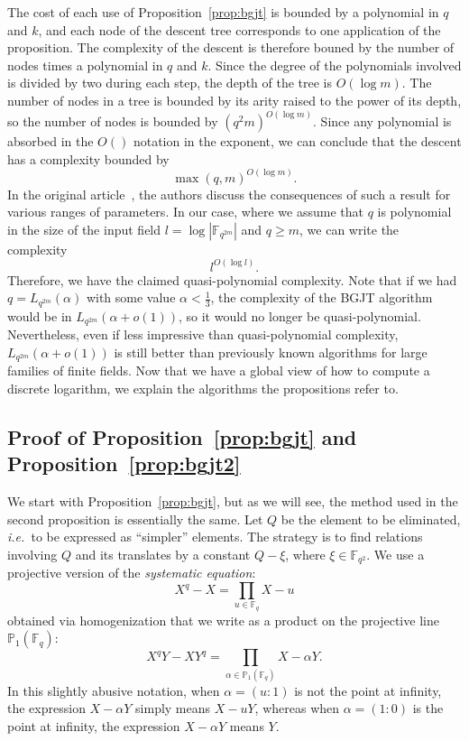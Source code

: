 \documentclass[a4paper,11pt]{article}
\theoremstyle{break}
\theoremstyle{sc}
\theoremstyle{definition}
\theoremstyle{remark}
\newcommand{\ie}{\emph{i.e.\ }}
\begin{document}
The cost of each use of Proposition~\ref{prop:bgjt} is bounded by a polynomial in $q$ and
$k$, and each node of the descent tree corresponds to one application of the
proposition. The complexity of the descent is therefore bouned by the number of
nodes times a polynomial in $q$ and $k$. Since the degree of the polynomials
involved is divided by two during each step, the depth of the tree is
$O(\log m)$. The number of nodes in a tree is bounded by its arity raised to the power
of its depth, so the number of nodes is bounded by $(q^2m)^{O(\log m)}$. Since
any polynomial is absorbed in the $O()$ notation in the exponent, we can
conclude that the descent has a complexity bounded by
\[
  \max(q, m)^{O(\log m)}.
\]
In the original article~\cite{BGJT13}, the authors discuss the consequences of
such a result for various ranges of parameters. In our case, where we assume
that $q$ is polynomial in the size of the input field $l=\log|\mathbb{F}_{q^{2m}}|$ and
$q\geq m$, we can write the complexity
\[
  l^{O(\log l)}.
\]
Therefore, we have the claimed quasi-polynomial complexity. Note that if we had
$q = L_{q^{2m}}(\alpha)$ with some value $\alpha<\frac{1}{3}$, the complexity of the BGJT
algorithm would be in
$L_{q^{2m}}(\alpha+o(1))$, so it would no longer be quasi-polynomial. Nevertheless, even if
less impressive than quasi-polynomial complexity, $L_{q^{2m}}(\alpha+o(1))$ is
still better than previously known algorithms for large families
of finite
fields. Now that we have a global view of how to compute a discrete logarithm,
we explain the algorithms the propositions refer to.

\subsection{Proof of Proposition~\ref{prop:bgjt} and Proposition~\ref{prop:bgjt2}}

We start with Proposition~\ref{prop:bgjt}, but as we will see, the method
used in the second proposition is essentially the same. Let $Q$ be the element to
be eliminated, \ie to be expressed as ``simpler'' elements.
The strategy is to find relations involving $Q$ and its
translates by a constant $Q-\xi$, where $\xi\in\mathbb{F}_{q^2}$. We use a
projective version of the
\emph{systematic equation}:
\[
  X^q - X = \prod_{u\in\mathbb{F}_q} X-u 
\]
obtained via homogenization that we write as a product on the projective
line $\mathbb{P}_1(\mathbb{F}_q)$:
  \begin{equation} 
  X^qY-XY^q = \prod_{\alpha\in\mathbb{P}_1(\mathbb{F}_q)} X - \alpha Y.
    \label{proj-eq}
  \end{equation}
In this slightly abusive notation, when $\alpha=(u:1)$ is not the point at
infinity, the expression $X-\alpha Y$ simply means $X-uY$, whereas when
$\alpha=(1:0)$ is the point at infinity, the expression $X-\alpha Y$ means $Y$.
\end{document}
